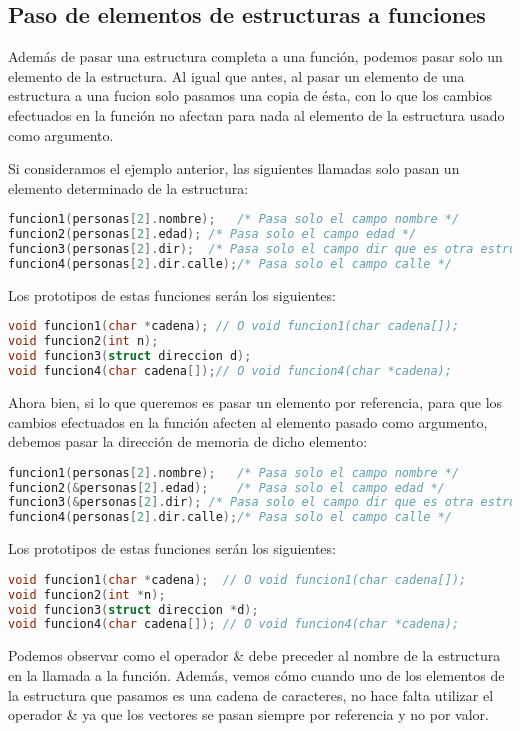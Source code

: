 \subsection{Paso de elementos de estructuras a funciones}{
Además de pasar una estructura completa a una función, podemos pasar solo un elemento de la estructura. Al igual que antes, al pasar un elemento de una estructura a una fucion solo pasamos una copia de ésta, con lo que los cambios efectuados en la función no afectan para nada al elemento de la estructura usado como argumento.

Si consideramos el ejemplo anterior, las siguientes llamadas solo pasan un elemento determinado de la estructura:
\begin{lstlisting}[language=C]
funcion1(personas[2].nombre);	/* Pasa solo el campo nombre */
funcion2(personas[2].edad);	/* Pasa solo el campo edad */
funcion3(personas[2].dir);	/* Pasa solo el campo dir que es otra estructura */
funcion4(personas[2].dir.calle);/* Pasa solo el campo calle */
\end{lstlisting}
Los prototipos de estas funciones serán los siguientes:
\begin{lstlisting}[language=C]
void funcion1(char *cadena); // O void funcion1(char cadena[]);
void funcion2(int n);
void funcion3(struct direccion d);
void funcion4(char cadena[]);// O void funcion4(char *cadena);
\end{lstlisting}
Ahora bien, si lo que queremos es pasar un elemento por referencia, para que los cambios efectuados en la función afecten al elemento pasado como argumento, debemos pasar la dirección de memoria de dicho elemento:
\begin{lstlisting}[language=C]
funcion1(personas[2].nombre);	/* Pasa solo el campo nombre */
funcion2(&personas[2].edad);	/* Pasa solo el campo edad */
funcion3(&personas[2].dir);	/* Pasa solo el campo dir que es otra estructura */
funcion4(personas[2].dir.calle);/* Pasa solo el campo calle */
\end{lstlisting}
Los prototipos de estas funciones serán los siguientes:
\begin{lstlisting}[language=C]
void funcion1(char *cadena);  // O void funcion1(char cadena[]);
void funcion2(int *n);
void funcion3(struct direccion *d);
void funcion4(char cadena[]); // O void funcion4(char *cadena);
\end{lstlisting}
Podemos observar como el operador \& debe preceder al nombre de la estructura en la llamada a la función. Además, vemos cómo cuando uno de los elementos de la estructura que pasamos es una cadena de caracteres, no hace falta utilizar el operador \& ya que los vectores se pasan siempre por referencia y no por valor.
}
